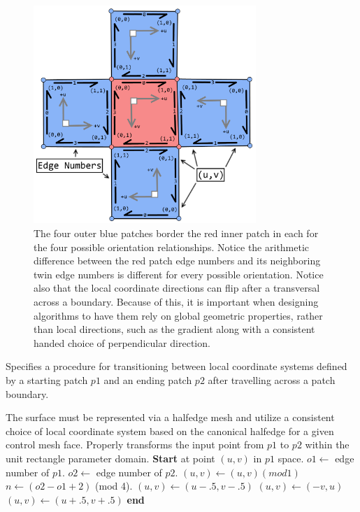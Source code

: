 \documentclass[12pt, letterpaper]{article}
\begin{document}
		\begin{figure}[h]
		\centering
		\includegraphics[width=0.75\textwidth]{LocalCoordinateTransversal}
		\caption{The four outer blue patches border the red inner patch in each for the four possible orientation relationships.
				Notice the arithmetic difference between the red patch edge numbers and its neighboring twin edge numbers is
				different for every possible orientation. Notice also that the local coordinate directions can flip after a transversal across a boundary.
				Because of this, it is important when designing algorithms to have them rely on global geometric properties, rather than local directions,
				such as the gradient along with a consistent handed choice of perpendicular direction.}
		\label{fig:LocalCoordinateOrientations}
		\end{figure}

		\begin{algorithm}                      %
		\caption{Specifies a procedure for transitioning between local coordinate systems defined by a starting patch $p1$ and an ending patch $p2$ after travelling across a patch boundary.}
		\label{alg:Transition}       %
		\begin{algorithmic}                    %
			\REQUIRE The surface must be represented via a halfedge mesh and utilize a consistent choice of local coordinate system based on the
					canonical halfedge for a given control mesh face.
			\ENSURE Properly transforms the input point from $p1$ to $p2$ within the unit rectangle parameter domain.
			\STATE \textbf{Start} at point $(u, v)$ in $p1$ space.
			\STATE $o1 \leftarrow$ edge number of $p1$.
			\STATE $o2 \leftarrow$ edge number of $p2$.
			\STATE $(u, v) \leftarrow (u, v) (mod 1)$ 
			\STATE $n \leftarrow (o2 - o1 + 2)$ (mod 4). 
			\STATE $(u, v)  \leftarrow (u - .5, v - .5)$
				\STATE $(u, v) \leftarrow (-v, u)$
			\ENDFOR
			\STATE $(u, v)  \leftarrow (u + .5, v + .5)$
			\STATE \textbf{end}
		\end{algorithmic}
		\end{algorithm}
\end{document}
